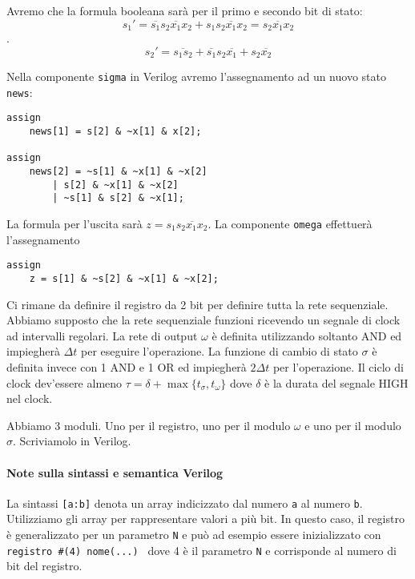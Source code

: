 Avremo che la formula booleana sarà per il primo e secondo bit di stato:
\[ s_1' = \overbar{s_1}s_2\overbar{x_1}x_2 + s_1s_2\overbar{x_1}x_2 = s_2\overbar{x_1}x_2 \]. 
\[ s_2' = \overbar{s_1s_2}+ \overbar{s_1}s_2\overbar{x_1} + s_2\overbar{x_2}\]

Nella componente \verb|sigma| in Verilog avremo l'assegnamento ad un nuovo stato \verb|news|:

\begin{lstlisting}[style={verilog}]
assign
	news[1] = s[2] & ~x[1] & x[2];

assign    
	news[2] = ~s[1] & ~x[1] & ~x[2] 
		| s[2] & ~x[1] & ~x[2] 
		| ~s[1] & s[2] & ~x[1];
\end{lstlisting}

La formula per l'uscita sarà $ z = s_1\overbar{s_2x_1x_2} $. La componente \verb|omega| effettuerà l'assegnamento 

\begin{lstlisting}[style={verilog}]
assign
	z = s[1] & ~s[2] & ~x[1] & ~x[2];
\end{lstlisting}



 Ci rimane da definire il registro da 2 bit per definire tutta la rete sequenziale. Abbiamo supposto che la rete sequenziale funzioni ricevendo un segnale di clock ad intervalli regolari.
La rete di output $ \omega $ è definita utilizzando soltanto AND ed impiegherà $ \Delta t $ per eseguire l'operazione. La funzione di cambio di stato $ \sigma $ è definita invece con 1 AND e 1 OR ed impiegherà $ 2\Delta t $ per l'operazione.
Il ciclo di clock dev'essere almeno $ \tau = \delta + \max\{t_{\sigma}, t_{\omega}\} $ dove $ \delta $ è la durata del segnale HIGH nel clock.

Abbiamo 3 moduli. Uno per il registro, uno per il modulo $ \omega $ e uno per il modulo $ \sigma $. Scriviamolo in Verilog.

\paragraph{Note sulla sintassi e semantica Verilog}

La sintassi \verb|[a:b]| denota un array indicizzato dal numero \verb|a| al numero \verb|b|. Utilizziamo gli array per rappresentare valori a più bit. In questo caso, il registro è generalizzato per un parametro \verb|N| e può ad esempio essere inizializzato con \verb|registro #(4) nome(...) | dove 4 è il parametro \verb|N| e corrisponde al numero di bit del registro.

